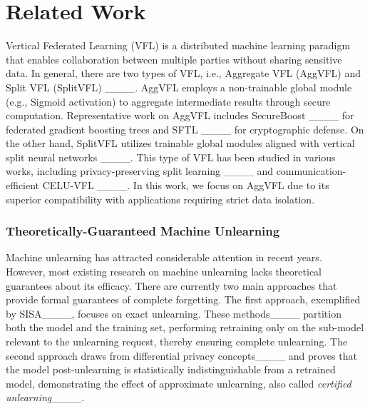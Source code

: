 \section{Related Work}




\color{black}
Vertical Federated Learning (VFL) is a distributed machine learning paradigm that enables collaboration between multiple parties without sharing sensitive data. In general, there are two types of VFL, i.e., Aggregate VFL (AggVFL) and Split VFL (SplitVFL) ____. AggVFL employs a non-trainable global module (e.g., Sigmoid activation) to aggregate intermediate results through secure computation. Representative work on AggVFL includes SecureBoost ____ for federated gradient boosting trees and SFTL ____ for  cryptographic defense. On the other hand, SplitVFL utilizes trainable global modules aligned with vertical split neural networks ____. This type of VFL has been studied in various works, including privacy-preserving split learning ____ and communication-efficient CELU-VFL ____. In this work, we focus on AggVFL due to its superior compatibility with applications requiring strict data isolation. 

\subsubsection*{Theoretically-Guaranteed Machine Unlearning}

Machine unlearning has attracted considerable attention in recent years. However, most existing research on machine unlearning lacks theoretical guarantees about its efficacy. There are currently two main approaches that provide formal guarantees of complete forgetting. The first approach, exemplified by SISA____, focuses on exact unlearning. These methods____ partition both the model and the training set, performing retraining only on the sub-model relevant to the unlearning request, thereby ensuring complete unlearning. The second approach draws from differential privacy concepts____ and proves that the model post-unlearning is statistically indistinguishable from a retrained model, demonstrating the effect of approximate unlearning, also called \textit{certified unlearning}____.

